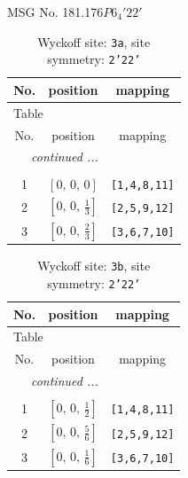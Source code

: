 \documentclass[fleqn,8pt]{jsarticle}
\begin{document}
\setcounter{MaxMatrixCols}{32}

\renewcommand{\tablename}{Table~}
\renewcommand{\figurename}{Figure~}
\begin{center}
\LARGE
MSG No. 181.176\quad$P6_{4}'22'$
\end{center}
\renewcommand{\arraystretch}{1.2}
\begin{longtable}{ccc}
\caption{Wyckoff site: {\tt 3a}, site symmetry: {\tt 2'22'}}
 \\
 \hline \hline
No. & position & mapping \\ \hline \endfirsthead

\multicolumn{2}{l}{\tablename\ \thetable{}} \\
 \hline \hline
No. & position & mapping \\ \hline \endhead

 \hline \hline
\multicolumn{2}{r}{\footnotesize\it continued ...} \\ \endfoot

 \hline \hline
\multicolumn{2}{r}{} \\ \endlastfoot

1 & $\left[ 0,\, 0,\, 0 \right]$ & {\tt [1,4,8,11]} \\ \hline
2 & $\left[ 0,\, 0,\, \frac{1}{3} \right]$ & {\tt [2,5,9,12]} \\ \hline
3 & $\left[ 0,\, 0,\, \frac{2}{3} \right]$ & {\tt [3,6,7,10]} \\
\end{longtable}
\renewcommand{\arraystretch}{1.2}
\begin{longtable}{ccc}
\caption{Wyckoff site: {\tt 3b}, site symmetry: {\tt 2'22'}}
 \\
 \hline \hline
No. & position & mapping \\ \hline \endfirsthead

\multicolumn{2}{l}{\tablename\ \thetable{}} \\
 \hline \hline
No. & position & mapping \\ \hline \endhead

 \hline \hline
\multicolumn{2}{r}{\footnotesize\it continued ...} \\ \endfoot

 \hline \hline
\multicolumn{2}{r}{} \\ \endlastfoot

1 & $\left[ 0,\, 0,\, \frac{1}{2} \right]$ & {\tt [1,4,8,11]} \\ \hline
2 & $\left[ 0,\, 0,\, \frac{5}{6} \right]$ & {\tt [2,5,9,12]} \\ \hline
3 & $\left[ 0,\, 0,\, \frac{1}{6} \right]$ & {\tt [3,6,7,10]} \\
\end{longtable}
\end{document}
